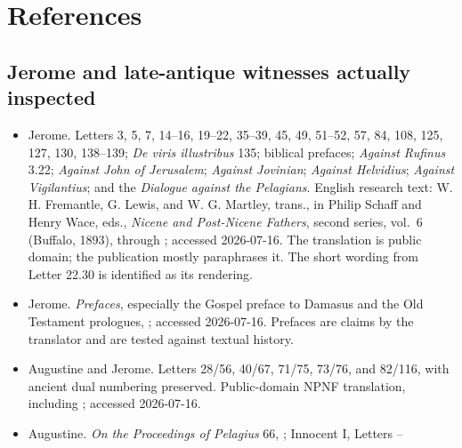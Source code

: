\section{References}\label{sec:jerome-references}

\begingroup
\setlength{\parskip}{0.15em}
\titlespacing*{\subsection}{0pt}{1.35ex}{0.45ex}

\subsection{Jerome and late-antique witnesses actually inspected}

\begin{itemize}
\item Jerome. Letters 3, 5, 7, 14--16, 19--22, 35--39, 45, 49, 51--52, 57,
84, 108, 125, 127, 130, 138--139; \emph{De viris illustribus} 135;
biblical prefaces;
\emph{Against Rufinus} 3.22; \emph{Against John of Jerusalem}; \emph{Against
Jovinian}; \emph{Against Helvidius}; \emph{Against Vigilantius}; and the
\emph{Dialogue against the Pelagians}. English research
text: W. H. Fremantle, G. Lewis, and W. G. Martley, trans., in Philip Schaff and
Henry Wace, eds., \emph{Nicene and Post-Nicene Fathers}, second series, vol.~6
(Buffalo, 1893), through
; accessed 2026-07-16. The translation is public domain; the publication
mostly paraphrases it. The short wording from Letter 22.30 is identified as its
rendering.
\item Jerome. \emph{Prefaces}, especially the Gospel preface to Damasus and the
Old Testament prologues,
; accessed 2026-07-16. Prefaces are claims by the translator and
are tested against textual history.
\item Augustine and Jerome. Letters 28/56, 40/67, 71/75, 73/76, and 82/116,
with ancient dual numbering preserved. Public-domain NPNF translation,
including
; accessed 2026-07-16.
\item Augustine. \emph{On the Proceedings of Pelagius} 66,
; Innocent I, Letters
--

\end{itemize}
